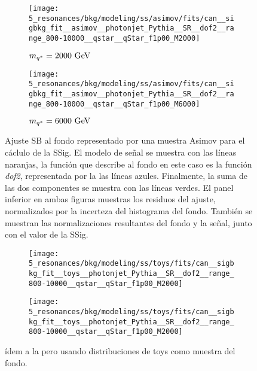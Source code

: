 \begin{figure}[ht!]
    \centering
    \begin{subfigure}[h]{0.49\linewidth}
        \centering
        \texttt{[image: 5\_resonances/bkg/modeling/ss/asimov/fits/can\_\_sigbkg\_fit\_\_asimov\_\_photonjet\_Pythia\_\_SR\_\_dof2\_\_range\_800-10000\_\_qstar\_\_qStar\_f1p00\_M2000]}
        \caption{\(m_{q^*} = 2000~\text{GeV}\)}
    \end{subfigure}
    \hfill
    \begin{subfigure}[h]{0.49\linewidth}
        \centering
        \texttt{[image: 5\_resonances/bkg/modeling/ss/asimov/fits/can\_\_sigbkg\_fit\_\_asimov\_\_photonjet\_Pythia\_\_SR\_\_dof2\_\_range\_800-10000\_\_qstar\_\_qStar\_f1p00\_M6000]}
        \caption{\(m_{q^*} = 6000~\text{GeV}\)}
    \end{subfigure}
    \caption{Ajuste \ac{SB} al fondo representado por una muestra Asimov para el cáclulo de la \ac{SSig}. El modelo de señal se muestra con las líneas naranjas, la función que describe al fondo en este caso es la función \textit{dof2}, representada por la las líneas azules. Finalmente, la suma de las dos componentes se muestra con las líneas verdes. El panel inferior en ambas figuras muestras los residuos del ajuste, normalizados por la incerteza del histograma del fondo. También se muestran las normalizaciones resultantes del fondo y la señal, junto con el valor de la \ac{SSig}.}
    \label{fig:bkg:modeling:sigbkg:sstest:sstest_asimov_examples}
\end{figure}

\begin{figure}[ht!]
    \centering
    \begin{subfigure}[h]{0.49\linewidth}
        \centering
        \texttt{[image: 5\_resonances/bkg/modeling/ss/toys/fits/can\_\_sigbkg\_fit\_\_toys\_\_photonjet\_Pythia\_\_SR\_\_dof2\_\_range\_800-10000\_\_qstar\_\_qStar\_f1p00\_M2000]}
    \end{subfigure}
    \hfill
    \begin{subfigure}[h]{0.49\linewidth}
        \centering
        \texttt{[image: 5\_resonances/bkg/modeling/ss/toys/fits/can\_\_sigbkg\_fit\_\_toys\_\_photonjet\_Pythia\_\_SR\_\_dof2\_\_range\_800-10000\_\_qstar\_\_qStar\_f1p00\_M2000]}
    \end{subfigure}
    \caption{ídem a la \Fig{\ref{fig:bkg:modeling:sigbkg:sstest:sstest_asimov_examples}} pero usando distribuciones de toys como muestra del fondo.}
    \label{fig:bkg:modeling:sigbkg:sstest:sstest_toys_examples}
\end{figure}

